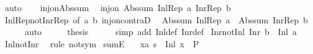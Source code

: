 \begin{isabellebody}
\ auto\isanewline
\ \ \isamarkupfalse%
\ inj{\isacharunderscore}{\kern0pt}on{\isacharunderscore}{\kern0pt}Abs{\isacharunderscore}{\kern0pt}sum\ \isamarkupfalse%
\ {\isachardoublequoteopen}inj{\isacharunderscore}{\kern0pt}on\ Abs{\isacharunderscore}{\kern0pt}sum\ {\isacharbraceleft}{\kern0pt}Inl{\isacharunderscore}{\kern0pt}Rep\ a{\isacharcomma}{\kern0pt}\ Inr{\isacharunderscore}{\kern0pt}Rep\ b{\isacharbraceright}{\kern0pt}{\isachardoublequoteclose}\ \isacommand{{\isachardot}{\kern0pt}}\isamarkupfalse%
\isanewline
\ \ \isamarkupfalse%
\ Inl{\isacharunderscore}{\kern0pt}Rep{\isacharunderscore}{\kern0pt}not{\isacharunderscore}{\kern0pt}Inr{\isacharunderscore}{\kern0pt}Rep\ {\isacharbrackleft}{\kern0pt}of\ a\ b{\isacharbrackright}{\kern0pt}\ inj{\isacharunderscore}{\kern0pt}on{\isacharunderscore}{\kern0pt}contraD\ \isamarkupfalse%
\ {\isachardoublequoteopen}Abs{\isacharunderscore}{\kern0pt}sum\ {\isacharparenleft}{\kern0pt}Inl{\isacharunderscore}{\kern0pt}Rep\ a{\isacharparenright}{\kern0pt}\ {\isasymnoteq}\ Abs{\isacharunderscore}{\kern0pt}sum\ {\isacharparenleft}{\kern0pt}Inr{\isacharunderscore}{\kern0pt}Rep\ b{\isacharparenright}{\kern0pt}{\isachardoublequoteclose}\isanewline
\ \ \ \ \isamarkupfalse%
\ auto\isanewline
\ \ \isamarkupfalse%
\ \isamarkupfalse%
\ {\isacharquery}{\kern0pt}thesis\isanewline
\ \ \ \ \isamarkupfalse%
\ {\isacharparenleft}{\kern0pt}simp\ add{\isacharcolon}{\kern0pt}\ Inl{\isacharunderscore}{\kern0pt}def\ Inr{\isacharunderscore}{\kern0pt}def{\isacharparenright}{\kern0pt}\isanewline
{}\isamarkupfalse%
%
\endisatagproof
{\isafoldproof}%
%
\isadelimproof
\isanewline
%
\endisadelimproof
\isanewline
{}\isamarkupfalse%
\ Inr{\isacharunderscore}{\kern0pt}not{\isacharunderscore}{\kern0pt}Inl{\isacharcolon}{\kern0pt}\ {\isachardoublequoteopen}Inr\ b\ {\isasymnoteq}\ Inl\ a{\isachardoublequoteclose}\isanewline
%
\isadelimproof
\ \ %
\endisadelimproof
%
\isatagproof
{}\isamarkupfalse%
\ Inl{\isacharunderscore}{\kern0pt}not{\isacharunderscore}{\kern0pt}Inr\ \isamarkupfalse%
\ {\isacharparenleft}{\kern0pt}rule\ not{\isacharunderscore}{\kern0pt}sym{\isacharparenright}{\kern0pt}%
\endisatagproof
{\isafoldproof}%
%
\isadelimproof
\isanewline
%
\endisadelimproof
\isanewline
{}\isamarkupfalse%
\ sumE{\isacharcolon}{\kern0pt}\isanewline
\ \ \ {\isachardoublequoteopen}{\isasymAnd}x{\isacharcolon}{\kern0pt}{\isacharcolon}{\kern0pt}{\isacharprime}{\kern0pt}a{\isachardot}{\kern0pt}\ s\ {\isacharequal}{\kern0pt}\ Inl\ x\ {\isasymLongrightarrow}\ P{\isachardoublequoteclose}\isanewline

\end{isabellebody}
